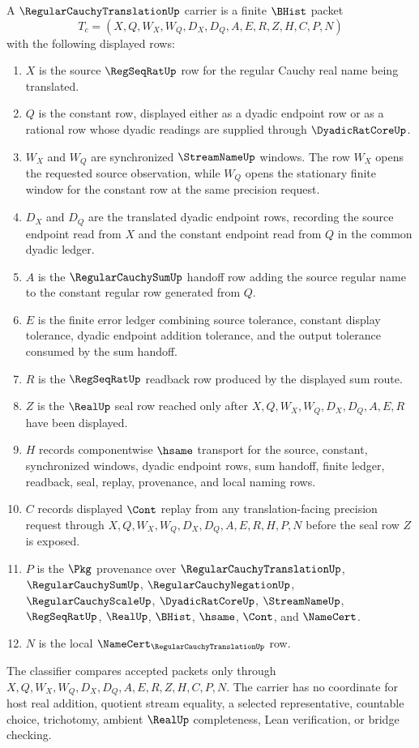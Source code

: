 \begin{definition}
\label{def:regular-cauchy-translation-carrier}
A $\RegularCauchyTranslationUp$ carrier is a finite $\BHist$ packet
$$
T_c=(X,Q,W_X,W_Q,D_X,D_Q,A,E,R,Z,H,C,P,N)
$$
with the following displayed rows:
\begin{enumerate}
\item $X$ is the source $\RegSeqRatUp$ row for the regular Cauchy real name being translated.
\item $Q$ is the constant row, displayed either as a dyadic endpoint row or as a rational row whose dyadic readings are supplied through $\DyadicRatCoreUp$.
\item $W_X$ and $W_Q$ are synchronized $\StreamNameUp$ windows. The row $W_X$ opens the requested source observation, while $W_Q$ opens the stationary finite window for the constant row at the same precision request.
\item $D_X$ and $D_Q$ are the translated dyadic endpoint rows, recording the source endpoint read from $X$ and the constant endpoint read from $Q$ in the common dyadic ledger.
\item $A$ is the $\RegularCauchySumUp$ handoff row adding the source regular name to the constant regular row generated from $Q$.
\item $E$ is the finite error ledger combining source tolerance, constant display tolerance, dyadic endpoint addition tolerance, and the output tolerance consumed by the sum handoff.
\item $R$ is the $\RegSeqRatUp$ readback row produced by the displayed sum route.
\item $Z$ is the $\RealUp$ seal row reached only after $X,Q,W_X,W_Q,D_X,D_Q,A,E,R$ have been displayed.
\item $H$ records componentwise $\hsame$ transport for the source, constant, synchronized windows, dyadic endpoint rows, sum handoff, finite ledger, readback, seal, replay, provenance, and local naming rows.
\item $C$ records displayed $\Cont$ replay from any translation-facing precision request through $X,Q,W_X,W_Q,D_X,D_Q,A,E,R,H,P,N$ before the seal row $Z$ is exposed.
\item $P$ is the $\Pkg$ provenance over $\RegularCauchyTranslationUp$, $\RegularCauchySumUp$, $\RegularCauchyNegationUp$, $\RegularCauchyScaleUp$, $\DyadicRatCoreUp$, $\StreamNameUp$, $\RegSeqRatUp$, $\RealUp$, $\BHist$, $\hsame$, $\Cont$, and $\NameCert$.
\item $N$ is the local $\NameCert_{\RegularCauchyTranslationUp}$ row.
\end{enumerate}
The classifier compares accepted packets only through $X,Q,W_X,W_Q,D_X,D_Q,A,E,R,Z,H,C,P,N$. The carrier has no coordinate for host real addition, quotient stream equality, a selected representative, countable choice, trichotomy, ambient $\RealUp$ completeness, Lean verification, or bridge checking.
\end{definition}

